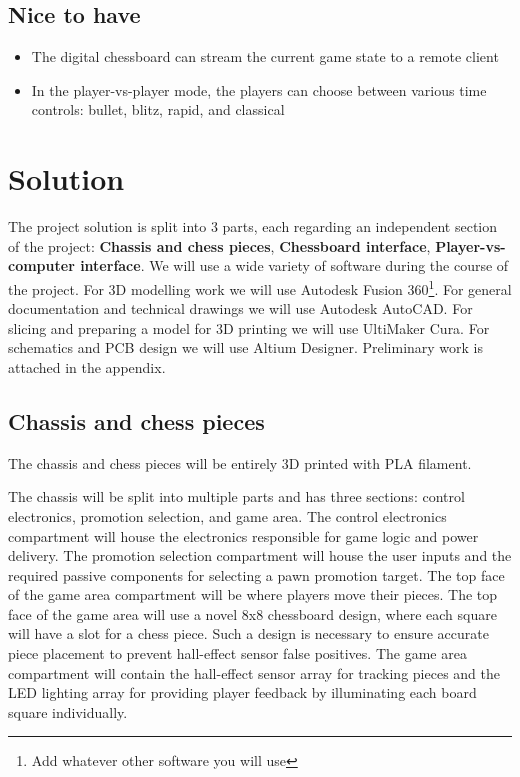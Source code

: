 \documentclass{article}
\begin{document}
\subsection*{Nice to have}
\begin{itemize}
	\item The digital chessboard can stream the current game state to a remote client
	\item In the player-vs-player mode, the players can choose between various time controls: bullet, blitz, rapid, and classical
\end{itemize}

\section{Solution}

The project solution is split into 3 parts, each regarding an independent section of the project: \textbf{Chassis and chess pieces}, \textbf{Chessboard interface}, \textbf{Player-vs-computer interface}. We will use a wide variety of software during the course of the project. For 3D modelling work we will use Autodesk Fusion 360\footnote{Add whatever other software you will use}. For general documentation and technical drawings we will use Autodesk AutoCAD. For slicing and preparing a model for 3D printing we will use UltiMaker Cura. For schematics and PCB design we will use Altium Designer. Preliminary work is attached in the appendix.

\subsection*{Chassis and chess pieces}

The chassis and chess pieces will be entirely 3D printed with PLA filament.

The chassis will be split into multiple parts and has three sections: control electronics, promotion selection, and game area. The control electronics compartment will house the electronics responsible for game logic and power delivery. The promotion selection compartment will house the user inputs and the required passive components for selecting a pawn promotion target. The top face of the game area compartment will be where players move their pieces. The top face of the game area will use a novel 8x8 chessboard design, where each square will have a slot for a chess piece. Such a design is necessary to ensure accurate piece placement to prevent hall-effect sensor false positives. The game area compartment will contain the hall-effect sensor array for tracking pieces and the LED lighting array for providing player feedback by illuminating each board square individually.
\end{document}
